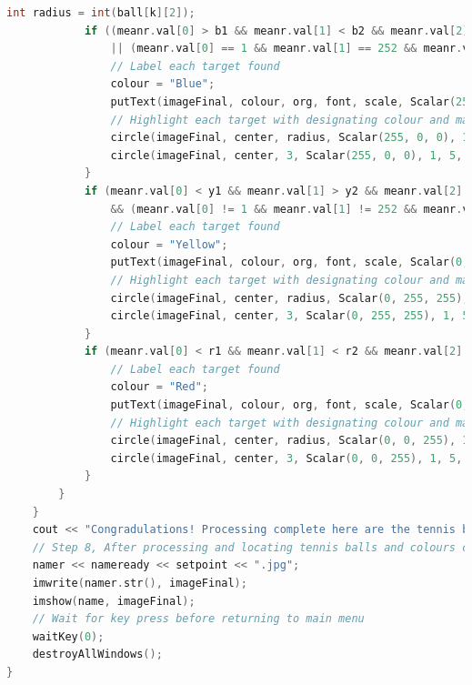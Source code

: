 \documentclass[a4paper, 10pt]{IEEEconf}
\begin{document}
\begin{lstlisting}[language = c++]
			int radius = int(ball[k][2]);
			if ((meanr.val[0] > b1 && meanr.val[1] < b2 && meanr.val[2] < b3)
				|| (meanr.val[0] == 1 && meanr.val[1] == 252 && meanr.val[2] == 251)) {
				// Label each target found
				colour = "Blue";
				putText(imageFinal, colour, org, font, scale, Scalar(255, 0, 0), thick, 5);
				// Highlight each target with designating colour and mark the center points
				circle(imageFinal, center, radius, Scalar(255, 0, 0), 1, 5, 0);
				circle(imageFinal, center, 3, Scalar(255, 0, 0), 1, 5, 0);
			}
			if (meanr.val[0] < y1 && meanr.val[1] > y2 && meanr.val[2] > y3
				&& (meanr.val[0] != 1 && meanr.val[1] != 252 && meanr.val[2] != 251)) {
				// Label each target found
				colour = "Yellow";
				putText(imageFinal, colour, org, font, scale, Scalar(0, 255, 255), thick, 5);
				// Highlight each target with designating colour and mark the center points
				circle(imageFinal, center, radius, Scalar(0, 255, 255), 1, 5, 0);
				circle(imageFinal, center, 3, Scalar(0, 255, 255), 1, 5, 0);
			}			
			if (meanr.val[0] < r1 && meanr.val[1] < r2 && meanr.val[2] > r3) {
				// Label each target found
				colour = "Red";
				putText(imageFinal, colour, org, font, scale, Scalar(0, 0, 255), thick, 5);
				// Highlight each target with designating colour and mark the center points
				circle(imageFinal, center, radius, Scalar(0, 0, 255), 1, 5, 0);
				circle(imageFinal, center, 3, Scalar(0, 0, 255), 1, 5, 0);
			}
		}
	}
	cout << "Congradulations! Processing complete here are the tennis balls found with their respected colours!\n\npress any key to go back to main menu, or hit esc twice to quit\n\n-------------------------------------------------------------------------\n" << endl;
	// Step 8, After processing and locating tennis balls and colours complete, display final results, and save for reference
	namer << nameready << setpoint << ".jpg";
	imwrite(namer.str(), imageFinal);
	imshow(name, imageFinal); 
	// Wait for key press before returning to main menu
	waitKey(0);
	destroyAllWindows();
}

\end{lstlisting}
\end{document}
